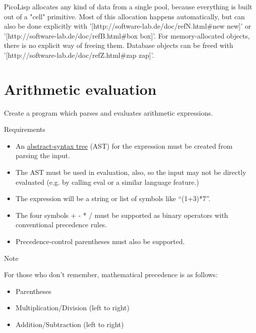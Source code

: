 \begin{wideverbatim}

PicoLisp allocates any kind of data from a single pool, because everything
is built out of a "cell" primitive. Most of this allocation happens
automatically, but can also be done explicitly with
'[http://software-lab.de/doc/refN.html#new new]' or
'[http://software-lab.de/doc/refB.html#box box]'. For memory-allocated
objects, there is no explicit way of freeing them. Database objects can be
freed with '[http://software-lab.de/doc/refZ.html#zap zap]'.

\end{wideverbatim}

\pagebreak{}
\section*{Arithmetic evaluation}


Create a program which parses and evaluates arithmetic expressions.

\begin{description}
\item[Requirements]
\end{description}

\begin{itemize}
\item
  An
  \href{http://en.wikipedia.org/wiki/Abstract\_syntax\_tree}{abstract-syntax
  tree} (AST) for the expression must be created from parsing the input.
\item
  The AST must be used in evaluation, also, so the input may not be
  directly evaluated (e.g. by calling eval or a similar language
  feature.)
\item
  The expression will be a string or list of symbols like ``(1+3)*7''.
\item
  The four symbols + - * / must be supported as binary operators with
  conventional precedence rules.
\item
   Precedence-control parentheses must also be supported.
\end{itemize}

\begin{description}
\item[Note]
\end{description}

For those who don't remember, mathematical precedence is as follows:

\begin{itemize}
\item
  Parentheses
\item
  Multiplication/Division (left to right)
\item
  Addition/Subtraction (left to right)
\end{itemize}

